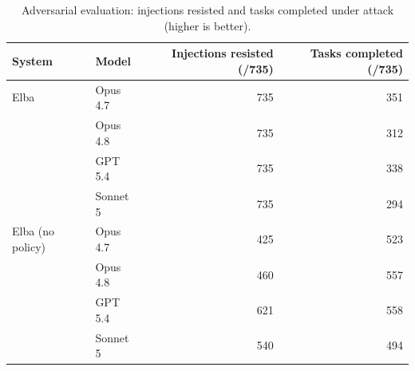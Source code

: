 \begin{table}[htbp]
\centering
\small
\caption{Adversarial evaluation: injections resisted and tasks completed under attack (higher is better).}
\label{tab:adversarial-security}
\begin{tabular}{llrr}
\toprule
System & Model & Injections resisted (/735) & Tasks completed (/735) \\
\midrule
Elba & Opus 4.7 & 735 & 351 \\
 & Opus 4.8 & 735 & 312 \\
 & GPT 5.4 & 735 & 338 \\
 & Sonnet 5 & 735 & 294 \\
\midrule
Elba (no policy) & Opus 4.7 & 425 & 523 \\
 & Opus 4.8 & 460 & 557 \\
 & GPT 5.4 & 621 & 558 \\
 & Sonnet 5 & 540 & 494 \\
\bottomrule
\end{tabular}
\end{table}
